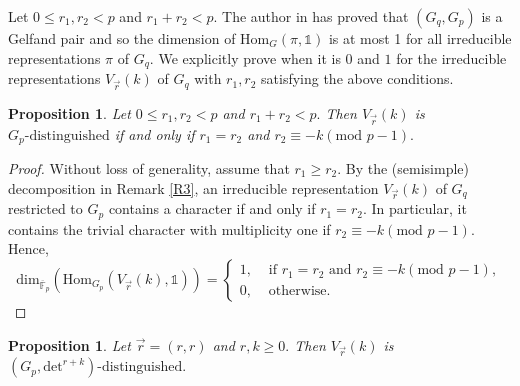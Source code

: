 \documentclass[10pt, reqno]{amsart}
\def\OF{{\overline{\mathbb F}}_p}
\def\Gq{{G_q}}
\def\Gp{{G_p}}
\numberwithin{equation}{section}
\newtheorem{proposition}[theorem]{Proposition}
\theoremstyle{remark}
\begin{document}
	Let $0\leq r_1,r_2<p$ and $r_1+r_2<p.$ The author in \cite{RZ} has proved that $(\Gq, \Gp)$ is a Gelfand pair and so the dimension of $\text{Hom}_G(\pi,\mathds{1})$ is at most 1 for all irreducible representations $\pi$ of $\Gq.$ We explicitly prove when it is $0$ and $1$ for the irreducible representations $V_{\vec{r}}(k)$ of $\Gq$ with $r_1,r_2$ satisfying the above conditions. 
    
    \begin{proposition}
      Let $0\leq r_1,r_2<p$ and $r_1+r_2<p.$ Then $V_{\vec{r}}(k)$ is $\Gp\text{-distinguished}$ if and only if $r_1=r_2$ and $r_2\equiv -k(\text{mod } p-1).$
    \end{proposition}

    \begin{proof}
         Without loss of generality, assume that $r_1\geq r_2.$ By the (semisimple) decomposition in Remark \ref{R3}, an irreducible representation $V_{\vec{r}}(k)$ of $\Gq$ restricted to $\Gp$ contains a character if and only if $r_1=r_2.$ In particular, it contains the trivial character with multiplicity one if $r_2\equiv -k(\text{mod } p-1).$ Hence,
	$$\mathrm{dim}_{\OF}(\mathrm{Hom}_{G_p}(V_{\vec{r}}(k), \mathds{1}))
	=\left\{\begin{array}{ll}
		1, & \text{ if }r_1=r_2\text{ and }r_2\equiv -k(\text{mod } p-1),\\
		0, & \text{ otherwise.}
	\end{array}\right.$$
    \end{proof}

\begin{proposition}
    Let $\vec{r}=(r,r)$ and $r,k\geq 0.$ Then $V_{\vec{r}}(k)$ is $(\Gp,\mathrm{det}^{r+k})\text{-distinguished}.$
	
\end{proposition}
	
\end{document}
